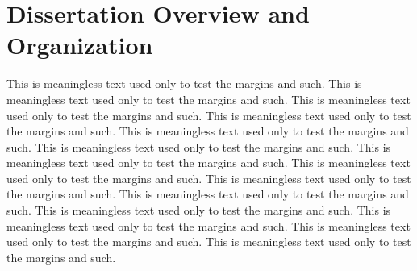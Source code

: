 \section{Dissertation Overview and Organization}

This is meaningless text used only to test the margins and such.
This is meaningless text used only to test the margins and such.
This is meaningless text used only to test the margins and such.
This is meaningless text used only to test the margins and such.
This is meaningless text used only to test the margins and such.
This is meaningless text used only to test the margins and such.
This is meaningless text used only to test the margins and such.
This is meaningless text used only to test the margins and such.
This is meaningless text used only to test the margins and such.
This is meaningless text used only to test the margins and such.
This is meaningless text used only to test the margins and such.
This is meaningless text used only to test the margins and such.
This is meaningless text used only to test the margins and such.
This is meaningless text used only to test the margins and such.
